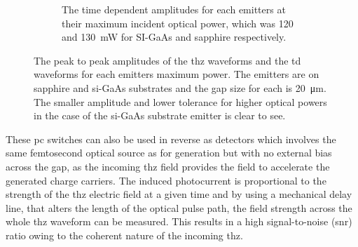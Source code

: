 \begin{figure}
\begin{subfigure}{1\textwidth}
    \caption{The time dependent amplitudes for each emitters at their maximum incident optical power, which was 120 and \SI{130}{mW} for SI\nobreakdash-GaAs and sapphire respectively.}
    \label{fig:saphGaAsTD}
\end{subfigure}
\captionsetup{font = footnotesize, justification = centering}
\caption[The Peak to Peak Amplitudes of the Terahertz Waveforms and the Time-Domain Waveforms for each Emitters Maximum Power]{The peak to peak amplitudes of the \acrshort{thz} waveforms and the \acrshort{td} waveforms for each emitters maximum power. The emitters are on sapphire and \acrshort{si}-GaAs substrates and the gap size for each is \SI{20}{\micro\metre}. The smaller amplitude and lower tolerance for higher optical powers in the case of the  \acrshort{si}-GaAs substrate emitter is clear to see.}
\label{fig:gaasvssapph}
\end{figure}

These \acrshort{pc} switches can also be used in reverse as detectors which involves the same femtosecond optical source as for generation but with no external bias across the gap, as the incoming \acrshort{thz} field provides the field to accelerate the generated charge carriers. The induced photocurrent is proportional to the strength of the \acrshort{thz} electric field at a given time and by using a mechanical delay line, that alters the length of the optical pulse path, the field strength across the whole \acrshort{thz} waveform can be measured. This results in a high signal-to-noise (\acrshort{snr}) ratio owing to the coherent nature of the incoming \acrshort{thz}.

